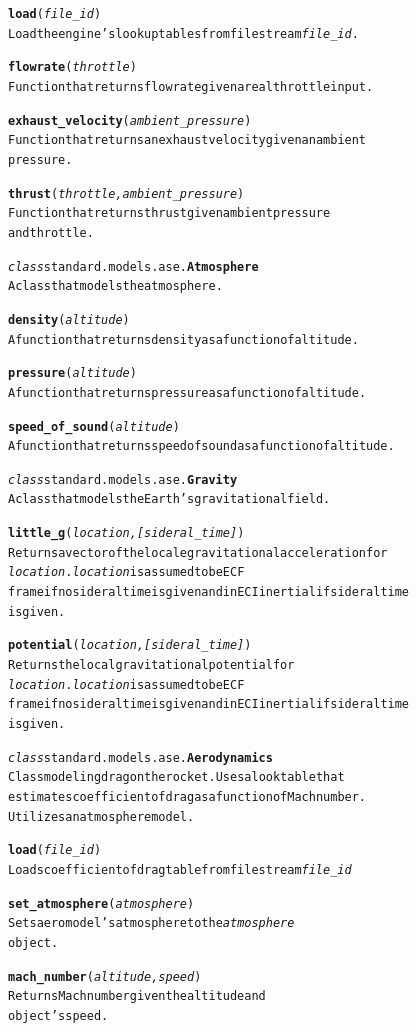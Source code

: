 \documentclass{book}
\begin{document}
\begin{alltt}
  \textbf{load}(\emph{file_id})
    Load the engine's lookup tables from file stream \emph{file_id}.

  \textbf{flowrate}(\emph{throttle})
    Function that returns flowrate given a real throttle input.

  \textbf{exhaust_velocity}(\emph{ambient_pressure})
    Function that returns an exhaust velocity given an ambient
    pressure.

  \textbf{thrust}(\emph{throttle, ambient_pressure})
    Function that returns thrust given ambient pressure
    and throttle.

\emph{class} standard.models.ase.\textbf{Atmosphere}
  A class that models the atmosphere.

  \textbf{density}(\emph{altitude} )
    A function that returns density as a function of altitude.

  \textbf{pressure}(\emph{altitude} )
    A function that returns pressure as a function of altitude.

  \textbf{speed_of_sound}(\emph{altitude} )
    A function that returns speed of sound as a function of altitude.

\emph{class} standard.models.ase.\textbf{Gravity}
  A class that models the Earth's gravitational field.

  \textbf{little_g}(\emph{location, [sideral_time] } )
    Returns a vector of the locale gravitational acceleration for
    \emph{location}. \emph{location} is assumed to be ECF
    frame if no sideral time is given and in ECI inertial if sideral time
    is given.

  \textbf{potential}(\emph{location, [sideral_time] } )
    Returns the local gravitational potential for
    \emph{location}. \emph{location} is assumed to be ECF
    frame if no sideral time is given and in ECI inertial if sideral time
    is given.

\emph{class} standard.models.ase.\textbf{Aerodynamics}
  Class modeling drag on the rocket. Uses a look table that
  estimates coefficient of drag as a function of Mach number.
  Utilizes an atmosphere model.

  \textbf{load}(\emph{file_id})
    Loads coefficient of drag table from file stream \emph{file_id}

  \textbf{set_atmosphere}(\emph{atmosphere})
    Sets aero model's atmosphere to the \emph{atmosphere}
    object.

  \textbf{mach_number}(\emph{ altitude, speed})
    Returns Mach number given the altitude and
    object's speed.


\end{alltt}
\end{document}
